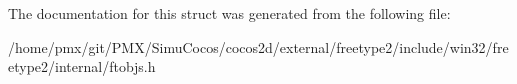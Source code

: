 The documentation for this struct was generated from the following file\+:\begin{DoxyCompactItemize}
\item 
/home/pmx/git/\+P\+M\+X/\+Simu\+Cocos/cocos2d/external/freetype2/include/win32/freetype2/internal/ftobjs.\+h\end{DoxyCompactItemize}
